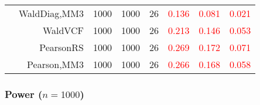 \documentclass[
]{article}
\begin{document}
\begin{table}[H]
{\begin{tabular}[t]{lrrrrrrr}
\hspace{1em} & WaldDiag,MM3 & 1000 & 1000 & 26 & \textcolor{red}{0.136} & \textcolor{red}{0.081} & \textcolor{red}{0.021}\\

\hspace{1em} & WaldVCF & 1000 & 1000 & 26 & \textcolor{red}{0.213} & \textcolor{red}{0.146} & \textcolor{red}{0.053}\\

\hspace{1em} & PearsonRS & 1000 & 1000 & 26 & \textcolor{red}{0.269} & \textcolor{red}{0.172} & \textcolor{red}{0.071}\\

\hspace{1em} & Pearson,MM3 & 1000 & 1000 & 26 & \textcolor{red}{0.266} & \textcolor{red}{0.168} & \textcolor{red}{0.058}\\
\bottomrule
\end{tabular}}
\endgroup{}
\end{table}

\hypertarget{power-n1000}{%
\subsubsection{\texorpdfstring{Power
(\(n=1000\))}{Power (n=1000)}}\label{power-n1000}}
\end{document}
